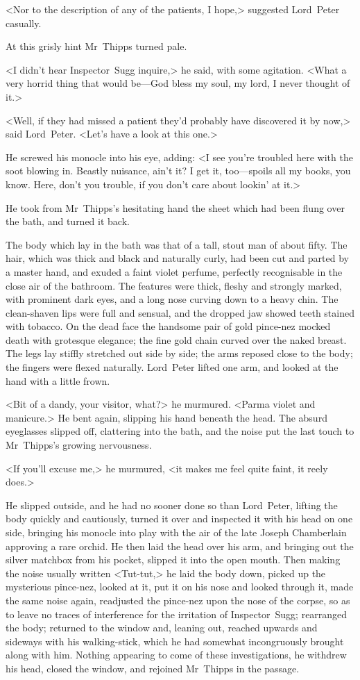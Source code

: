 <Nor to the description of any of the patients, I hope,> suggested Lord~Peter casually.

At this grisly hint Mr~Thipps turned pale.

<I didn't hear Inspector~Sugg inquire,> he said, with some agitation. <What a very horrid thing that would be—God bless my soul, my lord, I never thought of it.>

<Well, if they had missed a patient they'd probably have discovered it by now,> said Lord~Peter. <Let's have a look at this one.>

He screwed his monocle into his eye, adding: <I see you're troubled here with the soot blowing in. Beastly nuisance, ain't it? I get it, too—spoils all my books, you know. Here, don't you trouble, if you don't care about lookin' at it.>

He took from Mr~Thipps's hesitating hand the sheet which had been flung over the bath, and turned it back.

The body which lay in the bath was that of a tall, stout man of about fifty. The hair, which was thick and black and naturally curly, had been cut and parted by a master hand, and exuded a faint violet perfume, perfectly recognisable in the close air of the bathroom. The features were thick, fleshy and strongly marked, with prominent dark eyes, and a long nose curving down to a heavy chin. The clean-shaven lips were full and sensual, and the dropped jaw showed teeth stained with tobacco. On the dead face the handsome pair of gold pince-nez mocked death with grotesque elegance; the fine gold chain curved over the naked breast. The legs lay stiffly stretched out side by side; the arms reposed close to the body; the fingers were flexed naturally. Lord~Peter lifted one arm, and looked at the hand with a little frown.

<Bit of a dandy, your visitor, what?> he murmured. <Parma violet and manicure.> He bent again, slipping his hand beneath the head. The absurd eyeglasses slipped off, clattering into the bath, and the noise put the last touch to Mr~Thipps's growing nervousness.

<If you'll excuse me,> he murmured, <it makes me feel quite faint, it reely does.>

He slipped outside, and he had no sooner done so than Lord~Peter, lifting the body quickly and cautiously, turned it over and inspected it with his head on one side, bringing his monocle into play with the air of the late Joseph Chamberlain approving a rare orchid. He then laid the head over his arm, and bringing out the silver matchbox from his pocket, slipped it into the open mouth. Then making the noise usually written <Tut-tut,> he laid the body down, picked up the mysterious pince-nez, looked at it, put it on his nose and looked through it, made the same noise again, readjusted the pince-nez upon the nose of the corpse, so as to leave no traces of interference for the irritation of Inspector~Sugg; rearranged the body; returned to the window and, leaning out, reached upwards and sideways with his walking-stick, which he had somewhat incongruously brought along with him. Nothing appearing to come of these investigations, he withdrew his head, closed the window, and rejoined Mr~Thipps in the passage.

